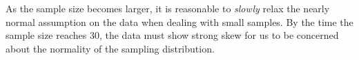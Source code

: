 \begin{tipBox}{
As the sample size becomes larger, it is reasonable to \emph{slowly} relax the nearly normal assumption on the data when dealing with small samples. By the time the sample size reaches 30, the data must show strong skew for us to be concerned about the normality of the sampling distribution.}
\end{tipBox}















%
%
%
%
%
